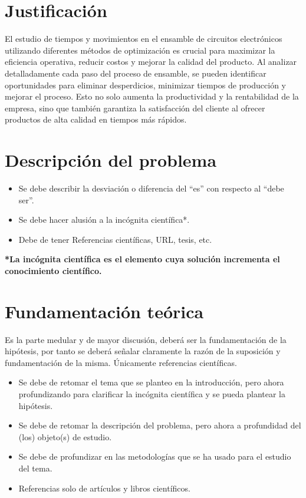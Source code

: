     \section{Justificación}
    
    El estudio de tiempos y movimientos en el ensamble de circuitos electrónicos utilizando diferentes métodos de optimización es crucial para maximizar la eficiencia operativa, reducir costos y mejorar la calidad del producto. Al analizar detalladamente cada paso del proceso de ensamble, se pueden identificar oportunidades para eliminar desperdicios, minimizar tiempos de producción y mejorar el proceso. Esto no solo aumenta la productividad y la rentabilidad de la empresa, sino que también garantiza la satisfacción del cliente al ofrecer productos de alta calidad en tiempos más rápidos.
        
    \section{Descripción del problema}
    \begin{itemize}
        \item Se debe describir la desviación o diferencia del ``es'' con respecto al ``debe ser''.
        \item Se debe hacer alusión a la incógnita científica*.
        \item Debe de tener Referencias científicas, URL, tesis, etc.
    \end{itemize}
    
    \textbf{*La incógnita científica es el elemento cuya solución incrementa el conocimiento científico.}
    \section{Fundamentación teórica}
    
    Es la parte medular y de mayor discusión, deberá ser la fundamentación de la hipótesis, por tanto se deberá señalar claramente la razón de la suposición y fundamentación de la misma. Únicamente referencias científicas.
    \begin{itemize}
        \item Se debe de retomar el tema que se planteo en la introducción, pero ahora profundizando para clarificar la incógnita científica y se pueda plantear la hipótesis.
        \item Se debe de retomar la descripción del problema, pero ahora a profundidad del (los) objeto(s) de estudio. 
        \item Se debe de profundizar en las metodologías que se ha usado para el estudio del tema.
        \item Referencias solo de artículos y libros científicos.
    \end{itemize}

